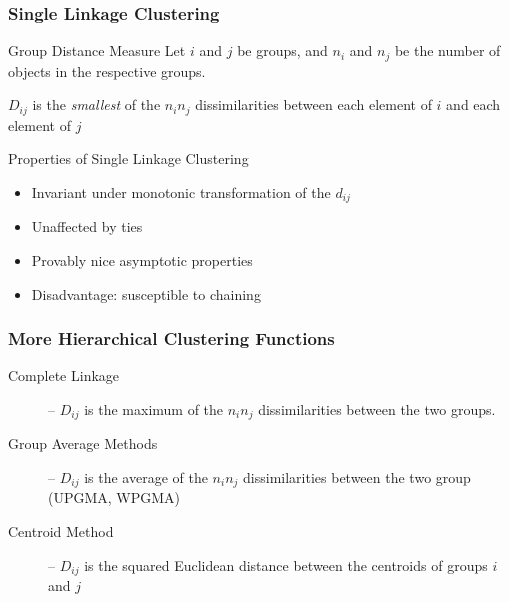 \documentclass{beamer}
\begin{document}
\begin{frame}
  \frametitle{Single Linkage Clustering}

\begin{block}{Group Distance Measure}
  Let $i$ and $j$ be groups, and $n_i$ and $n_j$ be the number of objects in the respective groups. 

  \smallskip

  $D_{ij}$ is the \emph{smallest} of the $n_i n_j$ dissimilarities between each element of $i$ and each element of $j$
\end{block}

Properties of Single Linkage Clustering
\begin{itemize}

\item Invariant under monotonic transformation of the $d_{ij}$

\item Unaffected by ties

\item Provably nice asymptotic properties

\item Disadvantage: susceptible to chaining

\end{itemize}

\end{frame}


{ 

}


\begin{frame}
  \frametitle{More Hierarchical Clustering Functions}


\begin{description}

\item[Complete Linkage] -- $D_{ij}$ is the maximum of the $n_i n_j$ dissimilarities between the two groups.

\item[Group Average Methods] -- $D_{ij}$ is the average of the $n_i n_j$  dissimilarities between the two group (UPGMA, WPGMA)

\item[Centroid Method] -- $D_{ij}$ is the squared Euclidean distance between the centroids of groups $i$ and $j$

\end{description}

\end{frame}
\end{document}
